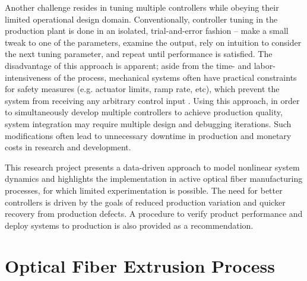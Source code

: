 Another challenge resides in tuning multiple controllers while obeying their limited operational design domain. Conventionally, controller tuning in the production plant is done in an isolated, trial-and-error fashion – make a small tweak to one of the parameters, examine the output, rely on intuition to consider the next tuning parameter, and repeat until performance is satisfied. The disadvantage of this approach is apparent; aside from the time- and labor- intensiveness of the process, mechanical systems often have practical constraints for safety measures (e.g. actuator limits, ramp rate, etc), which prevent the system from receiving any arbitrary control input \cite{constraints}. Using this approach, in order to simultaneously develop multiple controllers to achieve production quality, system integration may require multiple design and debugging iterations. Such modifications often lead to unnecessary downtime in production and monetary costs in research and development. 

This research project presents a data-driven approach to model nonlinear system dynamics and highlights the implementation in active optical fiber manufacturing processes, for which limited experimentation is possible. The need for better controllers is driven by the goals of reduced production variation and quicker recovery from production defects. A procedure to verify product performance and deploy systems to production is also provided as a recommendation. 

\section{Optical Fiber Extrusion Process}\label{ch:intro:fiber}

